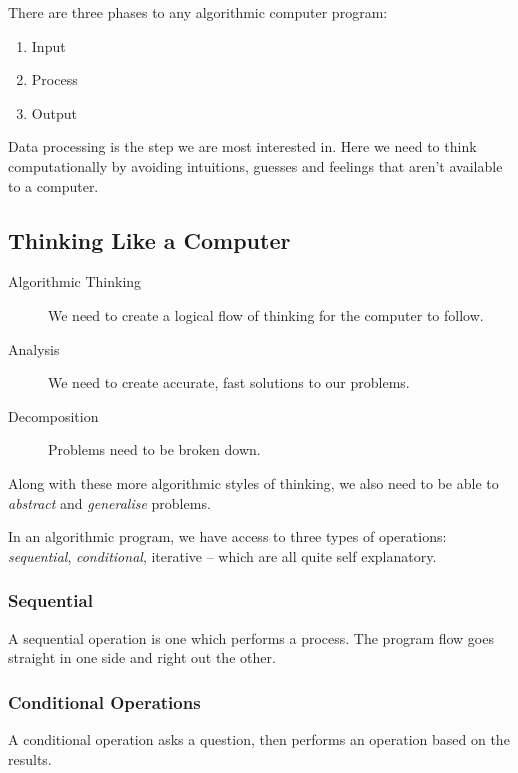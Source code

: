 There are three phases to any algorithmic computer program:
\begin{enumerate}
    \item Input
    \item Process
    \item Output
\end{enumerate}
Data processing is the step we are most interested in.
Here we need to think computationally by avoiding intuitions, guesses and feelings that aren't available to a computer.

\subsection{Thinking Like a Computer}\label{sub:thinking_like_a_computer}

\begin{description}
    \item[Algorithmic Thinking] We need to create a logical flow of thinking for the computer to follow.
    \item[Analysis] We need to create accurate, fast solutions to our problems.
    \item[Decomposition] Problems need to be broken down.
\end{description}
Along with these more algorithmic styles of thinking, we also need to be able to \emph{abstract} and \emph{generalise} problems.

In an algorithmic program, we have access to three types of operations: \emph{sequential}, \emph{conditional}, iterative -- which are all quite self explanatory.

\subsubsection{Sequential}\label{ssub:sequential}

A sequential operation is one which performs a process.
The program flow goes straight in one side and right out the other.

\subsubsection{Conditional Operations}\label{ssub:conditional_operations}

A conditional operation asks a question, then performs an operation based on the results.
